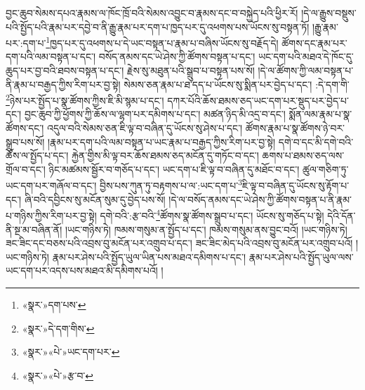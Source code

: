 བྱང་ཆུབ་སེམས་དཔའ་རྣམས་ལ་ཁོང་ཁྲོ་བའི་སེམས་འབྱུང་བ་རྣམས་དང་བ་བསྐྱེད་པའི་ཕྱིར་རོ། །དེ་ལ་རྒྱུས་བསྡུས་པའི་སྤྱོད་པའི་རྣམ་པར་དབྱེ་བ་ནི་རྒྱུ་རྣམ་པར་དག་པ་ཁྱད་པར་དུ་འཕགས་པས་ཡོངས་སུ་བསྟན་ཏོ། །རྒྱུ་རྣམ་པར་:དག་པ་\footnote{«སྣར་»དག་པས་}ཁྱད་པར་དུ་འཕགས་པ་དེ་ཡང་བསྟན་པ་རྣམ་པ་བཞིས་ཡོངས་སུ་བརྗོད་དེ། ཚོགས་དང་རྣམ་པར་དག་པའི་ལམ་བསྟན་པ་དང་། བསོད་ནམས་དང་ཡེ་ཤེས་ཀྱི་ཚོགས་བསྟན་པ་དང་། ཡང་དག་པའི་མཐའ་དེ་ཁོང་དུ་ཆུད་པར་བྱ་བའི་ཐབས་བསྟན་པ་དང་། རྗེས་སུ་མཐུན་པའི་སྒྲུབ་པ་བསྟན་པས་སོ། །དེ་ལ་ཚོགས་ཀྱི་ལམ་བསྟན་པ་ནི་རྣམ་པ་བརྒྱད་ཀྱིས་རིག་པར་བྱ་སྟེ། སེམས་ཅན་རྣམ་པ་ཐ་དད་པ་ཡོངས་སུ་སྨིན་པར་བྱེད་པ་དང་། :དེ་དག་གི་\footnote{«སྣར་»དེ་དག་གིས་}ཉེས་པར་སྤྱོད་པ་སྣ་ཚོགས་ཀྱིས་ཇི་མི་སྙམ་པ་དང་། དཀར་པོའི་ཆོས་ཐམས་ཅད་ཡང་དག་པར་སྡུད་པར་བྱེད་པ་དང་། བྱང་ཆུབ་ཀྱི་ཕྱོགས་ཀྱི་ཆོས་ལ་ལྷག་པར་དམིགས་པ་དང་། མཚན་ཉིད་མི་འདྲ་བ་དང་། སྨོན་ལམ་རྣམ་པ་སྣ་ཚོགས་དང་། འདུལ་བའི་སེམས་ཅན་ཇི་ལྟ་བ་བཞིན་དུ་ཡོངས་སུ་ཤེས་པ་དང་། ཚོགས་རྣམ་པ་སྣ་ཚོགས་ཉེ་བར་སྒྲུབ་པས་སོ། །རྣམ་པར་དག་པའི་ལམ་བསྟན་པ་ཡང་རྣམ་པ་བརྒྱད་ཀྱིས་རིག་པར་བྱ་སྟེ། དགེ་བ་དང་མི་དགེ་བའི་ཆོས་ལ་སྤྱོད་པ་དང་། རྐྱེན་གྱིས་མི་ལྟ་བར་ཆོས་ཐམས་ཅད་མངོན་དུ་གཏོང་བ་དང་། ཆགས་པ་ཐམས་ཅད་ལས་གྲོལ་བ་དང་། ཉིང་མཚམས་སྦྱོར་བ་གཅོད་པ་དང་། ཡང་དག་པ་ཇི་ལྟ་བ་བཞིན་དུ་མཐོང་བ་དང་། ཚུལ་གཅིག་ཏུ་ཡང་དག་པར་གཞོལ་བ་དང་། བྱིས་པས་ཀུན་ཏུ་བརྟགས་པ་ལ་:ཡང་དག་པ་\footnote{«སྣར་»«པེ་»ཡང་དག་པར་}ཇི་ལྟ་བ་བཞིན་དུ་ཡོངས་སུ་རྟོག་པ་དང་། ཞི་བའི་དབྱིངས་སུ་མངོན་སུམ་དུ་བྱེད་པས་སོ། །དེ་ལ་བསོད་ནམས་དང་ཡེ་ཤེས་ཀྱི་ཚོགས་བསྟན་པ་ནི་རྣམ་པ་གཉིས་ཀྱིས་རིག་པར་བྱ་སྟེ། དགེ་བའི་:རྩ་བའི་\footnote{«སྣར་»«པེ་»རྩ་བ་}ཚོགས་སྣ་ཚོགས་སྒྲུབ་པ་དང་། ཡོངས་སུ་གཅོད་པ་སྟེ། དེའི་དོན་ནི་སྔ་མ་བཞིན་ནོ། །ཡང་གཉིས་ཏེ། ཁམས་གསུམ་ན་སྤྱོད་པ་དང་། ཁམས་གསུམ་ནས་བྱུང་བའོ། །ཡང་གཉིས་ཏེ། ཟང་ཟིང་དང་བཅས་པའི་འབྲས་བུ་མངོན་པར་འགྲུབ་པ་དང་། ཟང་ཟིང་མེད་པའི་འབྲས་བུ་མངོན་པར་འགྲུབ་པའོ། །ཡང་གཉིས་ཏེ། རྣམ་པར་ཤེས་པའི་སྤྱོད་ཡུལ་ཡིན་པས་མཐའ་དམིགས་པ་དང་། རྣམ་པར་ཤེས་པའི་སྤྱོད་ཡུལ་ལས་ཡང་དག་པར་འདས་པས་མཐའ་མི་དམིགས་པའོ། །

